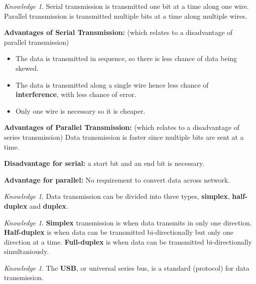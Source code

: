 \documentclass[8pt]{article}
\theoremstyle{remark}
\newtheorem{knowledge}[method]{Knowledge}
\begin{document}
        \begin{knowledge}
            Serial transmission is transmitted one bit at a time along one wire. Parallel transmission is transmitted multiple bits at a time along multiple wires.

            \textbf{Advantages of Serial Transmission:} (which relates to a disadvantage of parallel transmission)
            \begin{itemize}
                \item The data is transmitted in sequence, so there is less chance of data being skewed.
                \item The data is transmitted along a single wire hence less chance of \textbf{interference}, with less chance of error.
                \item Only one wire is necessary so it is cheaper.
            \end{itemize}

            \textbf{Advantages of Parallel Transmission:} (which relates to a disadvantage of series transmission) Data transmission is faster since multiple bits are sent at a time.

            \textbf{Disadvantage for serial:} a start bit and an end bit is necessary.

            \textbf{Advantage for parallel:} No requirement to convert data across network.
        \end{knowledge}

        \begin{knowledge}
            Data transmission can be divided into three types, \textbf{simplex}, \textbf{half-duplex} and \textbf{duplex}.
        \end{knowledge}

        \begin{knowledge}
            \textbf{Simplex} transmission is when data transmits in only one direction. \textbf{Half-duplex} is when data can be transmitted bi-directionally but only one direction at a time. \textbf{Full-duplex} is when data can be transmitted bi-directionally simultaniously.
        \end{knowledge}

        \begin{knowledge}
            The \textbf{USB}, or universal series bus, is a standard (protocol) for data transmission.
        \end{knowledge}
\end{document}

